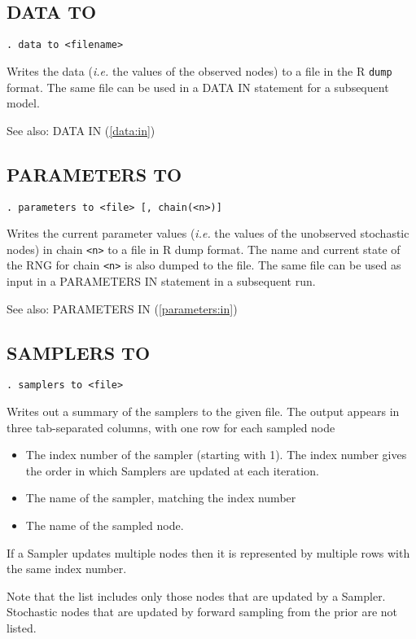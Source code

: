 \documentclass[11pt, a4paper, titlepage]{report}
\begin{document}
\subsection{DATA TO}
\label{data:to}
\begin{verbatim}
. data to <filename>
\end{verbatim}
Writes the data ({\em i.e.} the values of the observed nodes) to a
file in the R \texttt{dump} format. The same file can be used in a
DATA IN statement for a subsequent model.

See also: DATA IN (\ref{data:in})

\subsection{PARAMETERS TO}
\label{parameters:to}
\begin{verbatim}
. parameters to <file> [, chain(<n>)]
\end{verbatim}
Writes the current parameter values ({\em i.e.} the values of the
unobserved stochastic nodes) in chain \texttt{<n>} to a file in R dump
format. The name and current state of the RNG for chain \texttt{<n>}
is also dumped to the file.  The same file can be used as input in a
PARAMETERS IN statement in a subsequent run.

See also: PARAMETERS IN (\ref{parameters:in})

\subsection{SAMPLERS TO}
\label{samplers:to}
\begin{verbatim}
. samplers to <file>
\end{verbatim}
Writes out a summary of the samplers to the given file.  The output appears
in three tab-separated columns, with one row for each sampled node
\begin{itemize}
\item The index number of the sampler (starting with 1). The index number 
gives the order in which Samplers are updated at each iteration.
\item The name of the sampler, matching the index number
\item The name of the sampled node. 
\end{itemize}
If a Sampler updates multiple nodes then it is represented by multiple rows
with the same index number.

Note that the list includes only those nodes that are updated by a
Sampler.  Stochastic nodes that are updated by forward sampling from
the prior are not listed.
\end{document}
